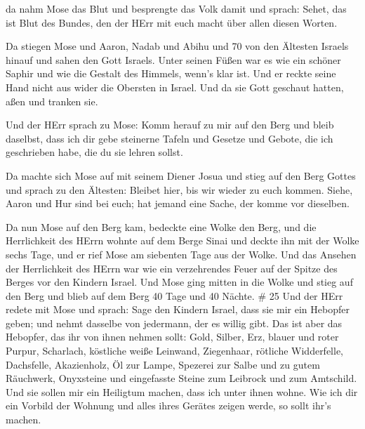  da nahm Mose das Blut und besprengte das Volk damit und
sprach: Sehet, das ist Blut des Bundes, den der HErr mit euch macht über
allen diesen Worten.

 Da stiegen Mose und Aaron, Nadab und Abihu und 70 von den
Ältesten Israels hinauf  und sahen den Gott Israels. Unter
seinen Füßen war es wie ein schöner Saphir und wie die Gestalt des
Himmels, wenn's klar ist.  Und er reckte seine Hand nicht
aus wider die Obersten in Israel. Und da sie Gott geschaut hatten, aßen
und tranken sie.

 Und der HErr sprach zu Mose: Komm herauf zu mir auf den
Berg und bleib daselbst, dass ich dir gebe steinerne Tafeln und Gesetze
und Gebote, die ich geschrieben habe, die du sie lehren sollst.

 Da machte sich Mose auf mit seinem Diener Josua und stieg
auf den Berg Gottes  und sprach zu den Ältesten: Bleibet
hier, bis wir wieder zu euch kommen. Siehe, Aaron und Hur sind bei euch;
hat jemand eine Sache, der komme vor dieselben.

 Da nun Mose auf den Berg kam, bedeckte eine Wolke den
Berg,  und die Herrlichkeit des HErrn wohnte auf dem Berge
Sinai und deckte ihn mit der Wolke sechs Tage, und er rief Mose am
siebenten Tage aus der Wolke.  Und das Ansehen der
Herrlichkeit des HErrn war wie ein verzehrendes Feuer auf der Spitze des
Berges vor den Kindern Israel.  Und Mose ging mitten in die
Wolke und stieg auf den Berg und blieb auf dem Berg 40 Tage und 40
Nächte. \# 25  Und der HErr redete mit Mose und sprach:
 Sage den Kindern Israel, dass sie mir ein Hebopfer geben;
und nehmt dasselbe von jedermann, der es willig gibt.  Das
ist aber das Hebopfer, das ihr von ihnen nehmen sollt: Gold, Silber,
Erz,  blauer und roter Purpur, Scharlach, köstliche weiße
Leinwand, Ziegenhaar,  rötliche Widderfelle, Dachsfelle,
Akazienholz,  Öl zur Lampe, Spezerei zur Salbe und zu gutem
Räuchwerk,  Onyxsteine und eingefasste Steine zum Leibrock
und zum Amtschild.  Und sie sollen mir ein Heiligtum machen,
dass ich unter ihnen wohne.  Wie ich dir ein Vorbild der
Wohnung und alles ihres Gerätes zeigen werde, so sollt ihr's machen.

